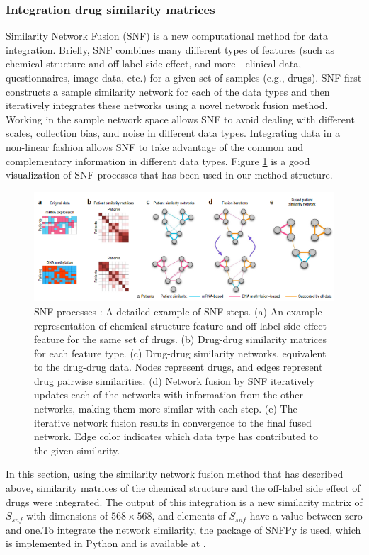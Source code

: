 \documentclass{bmcart}
\begin{document}
\subsubsection*{Integration drug similarity matrices}
Similarity Network Fusion (SNF)\cite{wang2014similarity} is a new computational method for data integration.  Briefly, SNF combines many different types of features (such as chemical structure and off-label side effect, and more - clinical data, questionnaires, image data, etc.) for a given set of samples (e.g., drugs). SNF first constructs a sample similarity network for each of the data types and then iteratively integrates these networks using a novel network fusion method. Working in the sample network space allows SNF to avoid dealing with different scales, collection bias, and noise in different data types. Integrating data in a non-linear fashion allows SNF to take advantage of the common and complementary information in different data types. Figure \ref{SNF} is a good visualization of SNF processes  that has been used in our method structure.

\begin{figure}[!h]
	\centering
	\includegraphics[scale=.53]{SNF.png}
	\caption{SNF processes \cite{wang2014similarity}:
	A detailed example of SNF steps. (a) An example representation of chemical structure feature and off-label side effect feature for the same set of drugs. (b) Drug-drug similarity matrices for each feature type. (c) Drug-drug similarity networks, equivalent to the drug-drug data. Nodes represent drugs, and edges represent drug pairwise similarities. (d) Network fusion by SNF iteratively updates each of the networks with information from the other networks, making them more similar with each step. (e) The iterative network fusion results in convergence to the final fused network. Edge color indicates which data type has contributed to the given similarity. }
	\label{SNF}
\end{figure}

In this section, using the similarity network fusion method that has described above, similarity matrices of the chemical structure and the off-label side effect of drugs were integrated. The output of this integration is a new similarity matrix of $S_{snf}$ with dimensions of $568 \times 568$, and elements of $S_{snf}$ have a value between zero and one.To integrate the network similarity, the package of SNFPy is used, which is implemented in Python and is available at \cite{SNFPy2020}.
\end{document}
